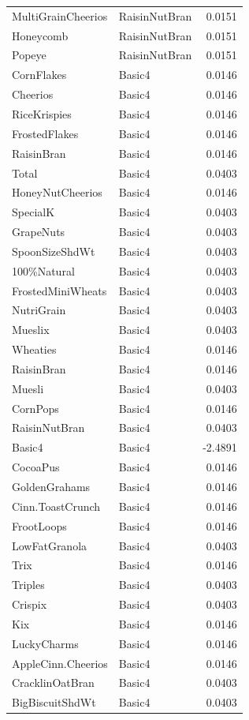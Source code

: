 \begin{longtable}{llr}
MultiGrainCheerios & RaisinNutBran & 0.0151 \\
Honeycomb & RaisinNutBran & 0.0151 \\
Popeye & RaisinNutBran & 0.0151 \\
CornFlakes & Basic4 & 0.0146 \\
Cheerios & Basic4 & 0.0146 \\
RiceKrispies & Basic4 & 0.0146 \\
FrostedFlakes & Basic4 & 0.0146 \\
RaisinBran & Basic4 & 0.0146 \\
Total & Basic4 & 0.0403 \\
HoneyNutCheerios & Basic4 & 0.0146 \\
SpecialK & Basic4 & 0.0403 \\
GrapeNuts & Basic4 & 0.0403 \\
SpoonSizeShdWt & Basic4 & 0.0403 \\
100\%Natural & Basic4 & 0.0403 \\
FrostedMiniWheats & Basic4 & 0.0403 \\
NutriGrain & Basic4 & 0.0403 \\
Mueslix & Basic4 & 0.0403 \\
Wheaties & Basic4 & 0.0146 \\
RaisinBran & Basic4 & 0.0146 \\
Muesli & Basic4 & 0.0403 \\
CornPops & Basic4 & 0.0146 \\
RaisinNutBran & Basic4 & 0.0403 \\
Basic4 & Basic4 & -2.4891 \\
CocoaPus & Basic4 & 0.0146 \\
GoldenGrahams & Basic4 & 0.0146 \\
Cinn.ToastCrunch & Basic4 & 0.0146 \\
FrootLoops & Basic4 & 0.0146 \\
LowFatGranola & Basic4 & 0.0403 \\
Trix & Basic4 & 0.0146 \\
Triples & Basic4 & 0.0403 \\
Crispix & Basic4 & 0.0403 \\
Kix & Basic4 & 0.0146 \\
LuckyCharms & Basic4 & 0.0146 \\
AppleCinn.Cheerios & Basic4 & 0.0146 \\
CracklinOatBran & Basic4 & 0.0403 \\
BigBiscuitShdWt & Basic4 & 0.0403 \\

\end{longtable}
